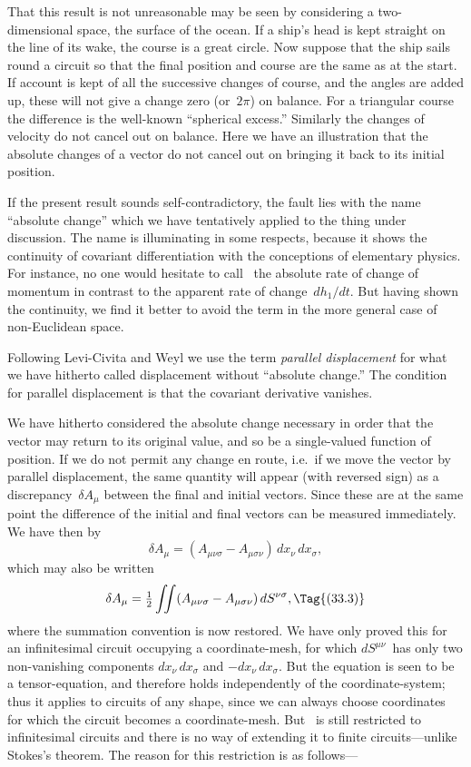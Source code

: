 \documentclass[12pt]{book}
\begin{document}
That this result is not unreasonable may be seen by considering a two-dimensional
space, the surface of the ocean. If a ship's head is kept straight
on the line of its wake, the course is a great circle. Now suppose that the ship
sails round a circuit so that the final position and course are the same as at
the start. If account is kept of all the successive changes of course, and the
angles are added up, these will not give a change zero (or~$2\pi$) on balance. For
a triangular course the difference is the well-known ``spherical excess.'' Similarly
the changes of velocity do not cancel out on balance. Here we have an
illustration that the absolute changes of a vector do not cancel out on bringing
it back to its initial position.

If the present result sounds self-contradictory, the fault lies with the name
``absolute change'' which we have tentatively applied to the thing under discussion.
The name is illuminating in some respects, because it shows the
continuity of covariant differentiation with the conceptions of elementary
physics. For instance, no one would hesitate to call~ the absolute rate
of change of momentum in contrast to the apparent rate of change~$dh_{1}/dt$. But
having shown the continuity, we find it better to avoid the term in the more
general case of non-Euclidean space.

Following Levi-Civita and Weyl we use the term \emph{parallel displacement} for
%
%
what we have hitherto called displacement without ``absolute change.'' The
condition for parallel displacement is that the covariant derivative vanishes.

We have hitherto considered the absolute change necessary in order that
the vector may return to its original value, and so be a single-valued function
of position. If we do not permit any change en route, i.e.\ if we move the vector
by parallel displacement, the same quantity will appear (with reversed sign)
as a discrepancy~$\delta A_{\mu}$ between the final and initial vectors. Since these are at
the same point the difference of the initial and final vectors can be measured
immediately. We have then by~
\[
\delta A_{\mu} = (A_{\mu\nu\sigma} - A_{\mu\sigma\nu})\, dx_{\nu}\, dx_{\sigma},
\]
which may also be written
\[
\delta A_{\mu} = \tfrac{1}{2} \iint (A_{\mu\nu\sigma} - A_{\mu\sigma\nu})\, dS^{\nu\sigma},
\Tag{(33.3)}
\]
where the summation convention is now restored. We have only proved this
for an infinitesimal circuit occupying a coordinate-mesh, for which $dS^{\mu\nu}$~has
only two non-vanishing components $dx_{\nu}\, dx_{\sigma}$ and $-dx_{\nu}\, dx_{\sigma}$. But the equation
is seen to be a tensor-equation, and therefore holds independently of the
coordinate-system; thus it applies to circuits of any shape, since we can always
choose coordinates for which the circuit becomes a coordinate-mesh. But ~is
still restricted to infinitesimal circuits and there is no way of extending it
to finite circuits---unlike Stokes's theorem. The reason for this restriction is as
follows---
\end{document}

